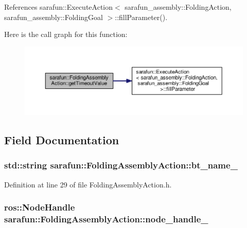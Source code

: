 References sarafun\-::\-Execute\-Action$<$ sarafun\-\_\-assembly\-::\-Folding\-Action, sarafun\-\_\-assembly\-::\-Folding\-Goal $>$\-::fill\-Parameter().



Here is the call graph for this function\-:
\nopagebreak
\begin{figure}[H]
\begin{center}
\leavevmode
\includegraphics[width=350pt]{dd/df2/classsarafun_1_1FoldingAssemblyAction_a14174e375aa1b8d5b63159f275b7d971_a14174e375aa1b8d5b63159f275b7d971_cgraph}
\end{center}
\end{figure}




\subsection{Field Documentation}
\hypertarget{classsarafun_1_1FoldingAssemblyAction_a058ad644052e931e604053b6064f7576_a058ad644052e931e604053b6064f7576}{
\subsubsection[{bt\-\_\-name\-\_\-}]{\setlength{\rightskip}{0pt plus 5cm}std\-::string sarafun\-::\-Folding\-Assembly\-Action\-::bt\-\_\-name\-\_\-\hspace{0.3cm}{\ttfamily [private]}}}\label{classsarafun_1_1FoldingAssemblyAction_a058ad644052e931e604053b6064f7576_a058ad644052e931e604053b6064f7576}


Definition at line 29 of file Folding\-Assembly\-Action.\-h.

\hypertarget{classsarafun_1_1FoldingAssemblyAction_a93ef41f7c8fe0fff59227e01deae7625_a93ef41f7c8fe0fff59227e01deae7625}{
\subsubsection[{node\-\_\-handle\-\_\-}]{\setlength{\rightskip}{0pt plus 5cm}ros\-::\-Node\-Handle sarafun\-::\-Folding\-Assembly\-Action\-::node\-\_\-handle\-\_\-\hspace{0.3cm}{\ttfamily [private]}}}\label{classsarafun_1_1FoldingAssemblyAction_a93ef41f7c8fe0fff59227e01deae7625_a93ef41f7c8fe0fff59227e01deae7625}


